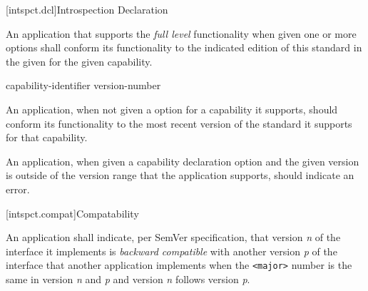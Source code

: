 [intspct.dcl]{Introspection Declaration}

\pnum
An application that supports the \emph{full level} functionality when given one
or more   options shall
conform its functionality to the indicated edition of this standard in the given
  for the given capability.

\begin{ncbnf}

\br
	capability-identifier   version-number

\end{ncbnf}

\pnum
An application, when not given a 
 option for a capability it supports, should conform
its functionality to the most recent version of the standard it supports for
that capability.

\pnum
An application, when given a capability declaration option and the given
version is outside of the version range that the application supports, should
indicate an error.

[intspct.compat]{Compatability}

\pnum

An application shall indicate, per SemVer specification, that version \emph{n}
of the interface it implements is \emph{backward compatible} with another
version \emph{p} of the interface that another application implements when the
\verb|<major>| number is the same in version \emph{n} and \emph{p} and version
\emph{n} follows version \emph{p}.

